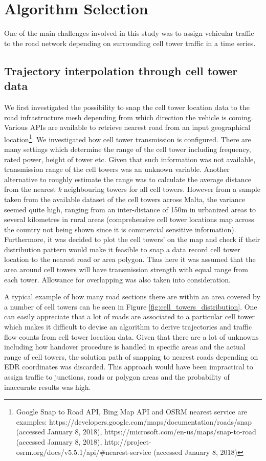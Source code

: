 \documentclass[12pt, a4paper]{report}
\theoremstyle{definition}
\theoremstyle{definition}%
\theoremstyle{definition}%
\theoremstyle{definition}%
\theoremstyle{definition}%
\theoremstyle{definition}%
\begin{document}
\section{Algorithm Selection} \label{section:methodology:algorithm_selection}

One of the main challenges involved in this study was to assign vehicular traffic to the road network depending on surrounding cell tower traffic in a time series.

\subsection{Trajectory interpolation through cell tower data} \label{subsection:methodology:trajectory_interpolation}
We first investigated the possibility to snap the cell tower location data to the road infrastructure mesh depending from which direction the vehicle is coming. Various APIs are available to retrieve nearest road from an input geographical location\footnote{Google Snap to Road API, Bing Map API and OSRM nearest service are examples: https://developers.google.com/maps/documentation/roads/snap (accessed January 8, 2018), https://microsoft.com/en-us/maps/snap-to-road (accessed January 8, 2018), http://project-osrm.org/docs/v5.5.1/api/\#nearest-service (accessed January 8, 2018)}. We investigated how cell tower transmission is configured. There are many settings which determine the range of the cell tower including frequency, rated power, height of tower etc. Given that such information was not available, transmission range of the cell towers was an unknown variable. Another alternative to roughly estimate the range was to calculate the average distance from the nearest \textit{k} neighbouring towers for all cell towers. However from a sample taken from the available dataset of the cell towers across Malta, the variance seemed quite high, ranging from an inter-distance of 150m in urbanized areas to several kilometres in rural areas (comprehensive cell tower locations map across the country not being shown since it is  commercial sensitive information). Furthermore, it was decided to plot the cell towers' on the map and check if their distribution pattern would make it feasible to snap a data record cell tower location to the nearest road or area polygon. Thus here it was assumed that the area around cell towers will have transmission strength with equal range from each tower. Allowance for overlapping was also taken into consideration. 

A typical example of how many road sections there are within an area covered by a number of cell towers can be seen in Figure \ref{fig:cell_towers_distribution}. One can easily appreciate that a lot of roads are associated to a particular cell tower which makes it difficult to devise an algorithm to derive trajectories and traffic flow counts from cell tower location data. Given that there are a lot of unknowns including how handover procedure is handled in specific areas and the actual range of cell towers, the solution path of snapping to nearest roads depending on EDR coordinates was discarded. This approach would have been impractical to assign traffic to junctions, roads or polygon areas and the probability of inaccurate results was high.
\end{document}
